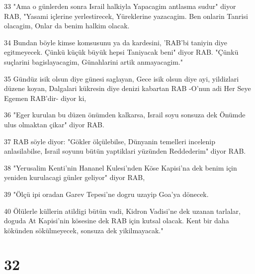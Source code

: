 \par 33 "Ama o günlerden sonra Israil halkiyla Yapacagim antlasma sudur" diyor RAB, "Yasami içlerine yerlestirecek, Yüreklerine yazacagim. Ben onlarin Tanrisi olacagim, Onlar da benim halkim olacak.
\par 34 Bundan böyle kimse komsusunu ya da kardesini, 'RAB'bi taniyin diye egitmeyecek. Çünkü küçük büyük hepsi Taniyacak beni" diyor RAB. "Çünkü suçlarini bagislayacagim, Günahlarini artik anmayacagim."
\par 35 Gündüz isik olsun diye günesi saglayan, Gece isik olsun diye ayi, yildizlari düzene koyan, Dalgalari kükresin diye denizi kabartan RAB -O'nun adi Her Seye Egemen RAB'dir- diyor ki,
\par 36 "Eger kurulan bu düzen önümden kalkarsa, Israil soyu sonsuza dek Önümde ulus olmaktan çikar" diyor RAB.
\par 37 RAB söyle diyor: "Gökler ölçülebilse, Dünyanin temelleri incelenip anlasilabilse, Israil soyunu bütün yaptiklari yüzünden Reddederim" diyor RAB.
\par 38 "Yerusalim Kenti'nin Hananel Kulesi'nden Köse Kapisi'na dek benim için yeniden kurulacagi günler geliyor" diyor RAB,
\par 39 "Ölçü ipi oradan Garev Tepesi'ne dogru uzayip Goa'ya dönecek.
\par 40 Ölülerle küllerin atildigi bütün vadi, Kidron Vadisi'ne dek uzanan tarlalar, doguda At Kapisi'nin kösesine dek RAB için kutsal olacak. Kent bir daha kökünden sökülmeyecek, sonsuza dek yikilmayacak."

\chapter{32}

